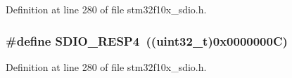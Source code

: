 Definition at line 280 of file stm32f10x\+\_\+sdio.\+h.

\subsubsection[{\texorpdfstring{S\+D\+I\+O\+\_\+\+R\+E\+S\+P4}{SDIO_RESP4}}]{\setlength{\rightskip}{0pt plus 5cm}\#define S\+D\+I\+O\+\_\+\+R\+E\+S\+P4~(({\bf uint32\+\_\+t})0x0000000\+C)}\hypertarget{group___s_d_i_o___response___registers_ga57c3f6414198e5497736e398c02a1d9e}{}\label{group___s_d_i_o___response___registers_ga57c3f6414198e5497736e398c02a1d9e}


Definition at line 280 of file stm32f10x\+\_\+sdio.\+h.


